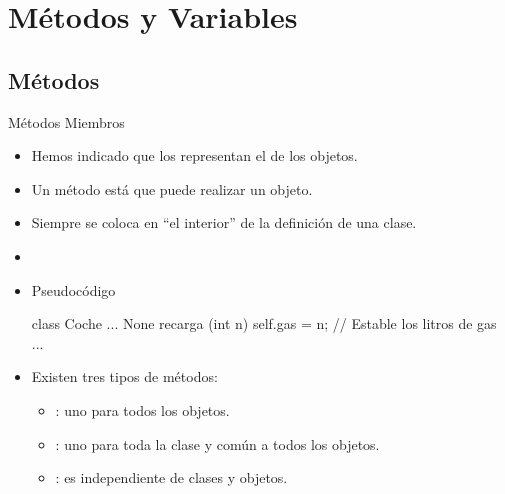 \documentclass[10pt,envcountsect,spanish]{beamer}
\begin{document}
\section{Métodos y Variables}


\subsection{Métodos}

\begin{frame}[fragile]{Métodos Miembros} 

\begin{itemize}
\item Hemos indicado que los  representan el  de los objetos.
\item Un método está  que puede realizar un objeto.

\item Siempre se coloca en ``el interior'' de la definición de una clase.

\item[]

\item[] \unEjemplo Pseudocódigo 
\begin{code}[basicstyle=\ttfamily\scriptsize]
class Coche {
   ...
   None recarga (int n) {
      self.gas = n;   // Estable los litros de gas
   } 
   ...
}
\end{code}

	
\item Existen tres tipos de métodos: 
\begin{itemize}
\item {}: uno para todos los objetos.
\item {}: uno para toda la clase y común a todos los objetos.
\item {}: es independiente de clases y objetos.
\end{itemize}
\end{itemize}

\end{frame}
\end{document}
